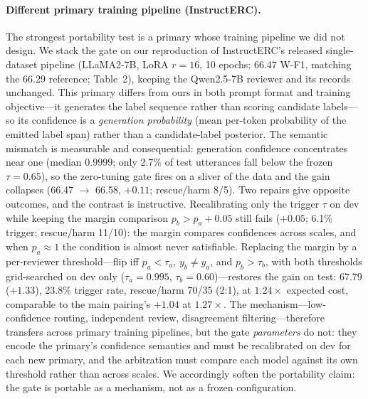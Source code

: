 \documentclass[final,5p,times,twocolumn]{elsarticle}
\begin{document}
\paragraph{Different primary training pipeline (InstructERC).}
The strongest portability test is a primary whose training pipeline we did
not design. We stack the gate on our reproduction of InstructERC's released
single-dataset pipeline \citep{lei2023instructerc} (LLaMA2-7B, LoRA $r{=}16$,
10 epochs; 66.47 W-F1, matching the 66.29 reference; Table~2), keeping the
Qwen2.5-7B reviewer and its records unchanged. This primary differs from
ours in both prompt format and training objective---it generates the label
sequence rather than scoring candidate labels---so its confidence is a
\emph{generation probability} (mean per-token probability of the emitted
label span) rather than a candidate-label posterior. The semantic mismatch
is measurable and consequential: generation confidence concentrates near
one (median $0.9999$; only 2.7\% of test utterances fall below the frozen
$\tau{=}0.65$), so the zero-tuning gate fires on a sliver of the data and
the gain collapses (66.47 $\to$ 66.58, $+0.11$; rescue/harm 8/5). Two
repairs give opposite outcomes, and the contrast is instructive.
Recalibrating only the trigger $\tau$ on dev while keeping the margin
comparison $p_b > p_a + 0.05$ still fails ($+0.05$; 6.1\% trigger;
rescue/harm 11/10): the margin compares confidences across scales, and when
$p_a \approx 1$ the condition is almost never satisfiable. Replacing the
margin by a per-reviewer threshold---flip iff $p_a < \tau_a$, $y_b \neq
y_a$, and $p_b > \tau_b$, with both thresholds grid-searched on dev only
($\tau_a{=}0.995$, $\tau_b{=}0.60$)---restores the gain on test:
67.79 ($+1.33$), 23.8\% trigger rate, rescue/harm 70/35 (2:1), at
$1.24\times$ expected cost, comparable to the main pairing's $+1.04$ at
$1.27\times$. The mechanism---low-confidence routing, independent review,
disagreement filtering---therefore transfers across primary training
pipelines, but the gate \emph{parameters} do not: they encode the primary's
confidence semantics and must be recalibrated on dev for each new primary,
and the arbitration must compare each model against its own threshold
rather than across scales. We accordingly soften the portability claim:
the gate is portable as a mechanism, not as a frozen configuration.
\end{document}
